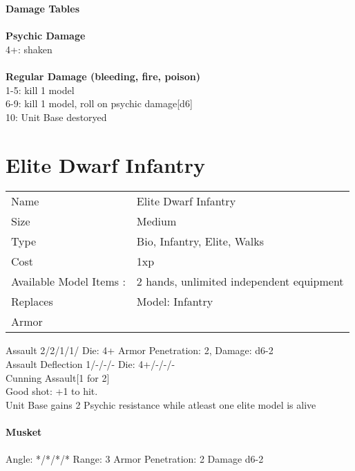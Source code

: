 {\bf Damage Tables} \\
\ \\ {\bf Psychic Damage } \\
4+: shaken \\
\ \\ {\bf Regular Damage (bleeding, fire, poison) } \\
1-5: kill 1 model \\
6-9: kill 1 model, roll on psychic damage[d6] \\
10: Unit Base destoryed \\









\pagebreak

\section{ Elite Dwarf Infantry }

\begin{tabular}{ll}
  Name & Elite Dwarf Infantry \\
  Size & Medium\\
  Type & Bio, Infantry, Elite, Walks\\
  Cost & 1xp\\
  Available Model Items : &2 hands, unlimited independent equipment\\
  Replaces & Model: Infantry\\
  Armor & 
\end{tabular}



Assault 2/2/1/1/ Die: 4+ Armor Penetration: 2, Damage: d6-2 \\
Assault Deflection 1/-/-/- Die: 4+/-/-/-\\
Cunning Assault[1 for 2]
\ \\

Good shot: +1 to hit. \\ Unit Base gains 2 Psychic resistance while atleast one elite model is alive \\

\ \\
{\bf Musket } \\
\ \\
Angle: */*/*/* Range: 3 Armor Penetration: 2 Damage d6-2 \\
\indent  \\





